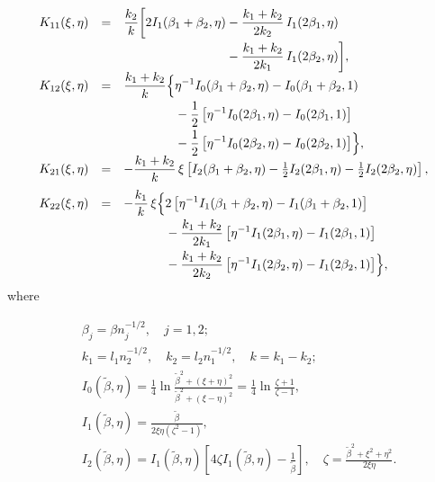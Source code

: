 \begin{equation}
	\label{BogdanovGuzEq37}
	\begin{array}{rcl}
		K_{11}(\xi,\eta)
		&=&
		\begin{aligned}[t]
		\dfrac{k_{2}}{k}
		\bigg[
		2I_{1}(\beta_{1}+\beta_{2},\eta)
		&-
		\frac{k_{1}+k_{2}}{2k_{2}}\,I_{1}(2\beta_{1},\eta)
		\\
		&-
		\frac{k_{1}+k_{2}}{2k_{1}}\,I_{1}(2\beta_{2},\eta)
		\bigg],
		\end{aligned}
		\\
		K_{12}(\xi,\eta)
		&=&
		\begin{aligned}[t]
			\frac{k_{1}+k_{2}}{k}
			\Bigl\{
			&
			\eta^{-1}I_{0}(\beta_{1}+\beta_{2},\eta)
			-
			I_{0}(\beta_{1}+\beta_{2},1)
			\\
			&
			-\frac12\left[
			\eta^{-1}I_{0}(2\beta_{1},\eta)
			-
			I_{0}(2\beta_{1},1)
			\right]
			\\
			&
			-\frac12\left[
			\eta^{-1}I_{0}(2\beta_{2},\eta)
			-
			I_{0}(2\beta_{2},1)
			\right]
			\Bigr\},
		\end{aligned}
		\\[3em]
		
		K_{21}(\xi,\eta)
		&=&
		-\dfrac{k_{1}+k_{2}}{k}\,
		\xi
		\left[
		I_{2}(\beta_{1}+\beta_{2},\eta)
		-
		\frac12 I_{2}(2\beta_{1},\eta)
		-
		\frac12 I_{2}(2\beta_{2},\eta)
		\right],
		\\[10pt]
		
		K_{22}(\xi,\eta)
		&=&
		\begin{aligned}[t]
			-\frac{k_{1}}{k}\,
			\xi
			\Bigl\{
			&
			2\left[
			\eta^{-1}I_{1}(\beta_{1}+\beta_{2},\eta)
			-
			I_{1}(\beta_{1}+\beta_{2},1)
			\right]
			\\
			&
			-\frac{k_{1}+k_{2}}{2k_{1}}
			\left[
			\eta^{-1}I_{1}(2\beta_{1},\eta)
			-
			I_{1}(2\beta_{1},1)
			\right]
			\\
			&
			-\frac{k_{1}+k_{2}}{2k_{2}}
			\left[
			\eta^{-1}I_{1}(2\beta_{2},\eta)
			-
			I_{1}(2\beta_{2},1)
			\right]
			\Bigr\},
		\end{aligned}
	\end{array}
\end{equation}
%
where		

\begin{equation}\label{BogdanovGuzEq38}
	\begin{aligned}
		&\beta_j = \beta n_j^{-1/2}, \quad j=1,2; 
		\\
		&k_1 = l_1 n_2^{-1/2}, \quad
		k_2 = l_2 n_1^{-1/2}, \quad
		k = k_1 - k_2; 
		\\
		&I_{0}(\tilde{\beta},\eta)
		= \frac{1}{4}\ln
		\frac{\tilde{\beta}^{2}+(\xi+\eta)^{2}}
		{\tilde{\beta}^{2}+(\xi-\eta)^{2}}
		= \frac{1}{4}\ln\frac{\zeta+1}{\zeta-1}, 
		\\
		&I_{1}(\tilde{\beta},\eta)
		= \frac{\tilde{\beta}}{2\xi\eta(\zeta^{2}-1)}, 
		\\
		&I_{2}(\tilde{\beta},\eta)=
		 I_{1}(\tilde{\beta},\eta)
		\left[4\zeta I_{1}(\tilde{\beta},\eta)-\frac{1}{\tilde{\beta}}\right],\quad
		\zeta = \frac{\tilde{\beta}^{2}+\xi^{2}+\eta^{2}}{2\xi\eta}.
	\end{aligned}
\end{equation}


